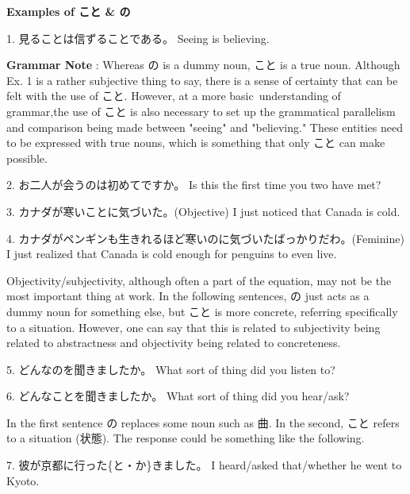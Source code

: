 \begin{center}
\textbf{Examples of こと \& の } 
\end{center}

\par{1. 見ることは信ずることである。 \hfill\break
Seeing is believing. }

\par{\textbf{Grammar Note }: Whereas の is a dummy noun, こと is a true noun. Although Ex. 1 is a rather subjective thing to say, there is a sense of certainty that can be felt with the use of こと. However, at a more basic understanding of grammar,the use of こと is also necessary to set up the grammatical parallelism and comparison being made between "seeing" and "believing." These entities need to be expressed with true nouns, which is something that only こと can make possible. }

\par{2. お二人が会うのは初めてですか。 \hfill\break
Is this the first time you two have met? }

\par{3. カナダが寒いことに気づいた。(Objective) \hfill\break
I just noticed that Canada is cold. }

\par{4. カナダがペンギンも生きれるほど寒いのに気づいたばっかりだわ。(Feminine) \hfill\break
I just realized that Canada is cold enough for penguins to even live. }

\par{  Objectivity\slash subjectivity, although often a part of the equation, may not be the most important thing at work. In the following sentences, の just acts as a dummy noun for something else, but こと is more concrete, referring specifically to a situation. However, one can say that this is related to subjectivity being related to abstractness and objectivity being related to concreteness. }

\par{5. どんなのを聞きましたか。 \hfill\break
What sort of thing did you listen to? \hfill\break
}

\par{6. どんなことを聞きましたか。 \hfill\break
What sort of thing did you hear\slash ask? }

\par{ In the first sentence の replaces some noun such as 曲. In the second, こと refers to a situation (状態). The response could be something like the following. }

\par{7. 彼が京都に行った\{と・か\}きました。 \hfill\break
I heard\slash asked that\slash whether he went to Kyoto. }

